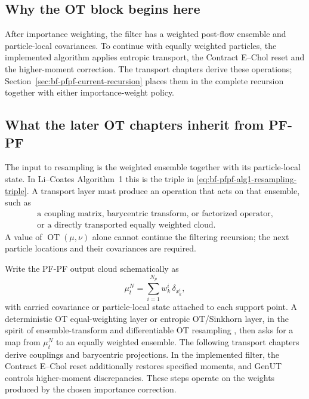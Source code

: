 \subsection{Why the OT block begins here}
\label{sec:bf-pfpf-ot-why-here}

After importance weighting, the filter has a weighted post-flow ensemble
and particle-local covariances. To continue with equally weighted particles,
the implemented algorithm applies entropic transport, the Contract E--Chol
reset and the higher-moment correction. The transport chapters derive these
operations; Section~\ref{sec:bf-pfpf-current-recursion} places them in the
complete recursion together with either importance-weight policy.

\subsection{What the later OT chapters inherit from PF-PF}
\label{sec:bf-pfpf-ot-handoff}

The input to resampling is the weighted ensemble together with its
particle-local state. In Li--Coates Algorithm~1 this is the triple in
\eqref{eq:bf-pfpf-alg1-resampling-triple}. A transport layer must produce an
operation that acts on that ensemble, such as
\begin{equation}
\label{eq:bf-pfpf-transport-object-inventory}
\begin{gathered}
 \text{a coupling matrix, barycentric transform, or factorized operator,}\\
 \text{or a directly transported equally weighted cloud.}
\end{gathered}
\end{equation}
A value of \(\operatorname{OT}(\mu,\nu)\) alone cannot continue the filtering
recursion; the next particle locations and their covariances are required.

Write the PF-PF output cloud schematically as
\begin{equation}
\label{eq:bf-pfpf-weighted-output-cloud}
  \mu_t^N
  =
  \sum_{i=1}^{N_p} w_k^i\,\delta_{x_k^i},
\end{equation}
with carried covariance or particle-local state attached to each support point.
A deterministic OT equal-weighting layer or entropic OT/Sinkhorn layer, in the
spirit of ensemble-transform and differentiable OT resampling
\citep{reich2013nonparametric,corenflos2021differentiable}, then asks for a
map from \(\mu_t^N\) to an equally weighted ensemble. The following transport
chapters derive couplings and barycentric projections. In the implemented
filter, the Contract E--Chol reset additionally restores specified moments,
and GenUT controls higher-moment discrepancies. These steps operate on the
weights produced by the chosen importance correction.

